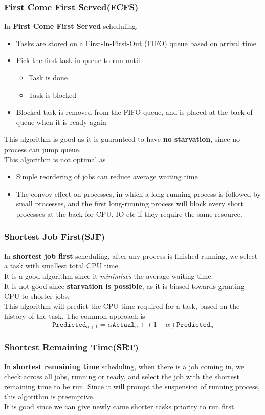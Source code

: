 \documentclass[11pt]{article}
\theoremstyle{definition}
\begin{document}
\subsubsection{First Come First Served(FCFS)}
In \textbf{First Come First Served} scheduling, 
\begin{itemize}[itemsep=0pt]
  \item Tasks are stored on a First-In-First-Out (FIFO) queue based on arrival time
  \item Pick the first task in queue to run until:
  \begin{itemize}[itemsep=0pt]
    \item Task is done
    \item Task is blocked
  \end{itemize}
  \item Blocked task is removed from the FIFO queue, and is placed at the back of queue when it is ready again
\end{itemize}
This algorithm is good as it is guaranteed to have \textbf{no starvation}, since no process can jump queue.\\
This algorithm is not optimal as 
\begin{itemize}[itemsep=0pt]
  \item Simple reordering of jobs can reduce average waiting time
  \item The convoy effect on processes, in which a long-running process is followed by small processes, and the first long-running process will block every short processes at the back for CPU, IO etc if they require the same resource.
\end{itemize}
\subsubsection{Shortest Job First(SJF)}
In \textbf{shortest job first} scheduling, after any process is finished running, we select a task with smallest total CPU time.\\
It is a good algorithm since it \textit{minimises} the average waiting time. \\
It is not good since \textbf{starvation is possible}, as it is biased towards granting CPU to shorter jobs.\\
This algorithm will predict the CPU time required for a task, based on the history of the task. The common approach is
\[
\texttt{Predicted}_{n+1}=\alpha \texttt{Actual}_n+(1-\alpha)\texttt{Predicted}_n
\]
\subsubsection{Shortest Remaining Time(SRT)}
In \textbf{shortest remaining time} scheduling, when there is a job coming in, we check across all jobs, running or ready, and select the job with the shortest remaining time to be run. Since it will prompt the suspension of running process, this algorithm is preemptive.\\
It is good since we can give newly came shorter tasks priority to run first.
\end{document}
